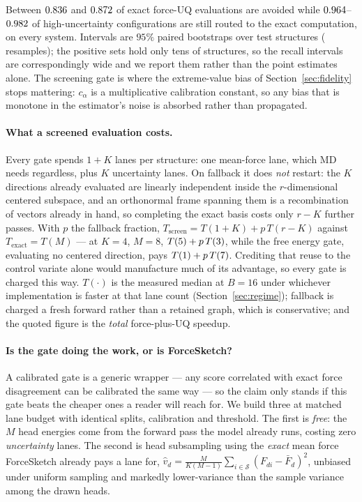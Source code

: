 \documentclass{article}
\begin{document}
Between $0.836$ and $0.872$ of exact force-UQ evaluations are avoided while
$0.964$--$0.982$ of high-uncertainty configurations are still routed to the
exact computation, on every system. Intervals are $95\%$ paired bootstraps over test structures
(\fsNBoot{} resamples); the positive sets hold only tens of structures, so the recall intervals are
correspondingly wide and we report them rather than the point estimates alone.
The screening gate is where the extreme-value bias of Section~\ref{sec:fidelity} stops mattering:
$c_\alpha$ is a multiplicative calibration constant, so any bias that is monotone in the estimator's
noise is absorbed rather than propagated.

\paragraph{What a screened evaluation costs.}
Every gate spends $1{+}K$ lanes per structure: one mean-force lane, which MD needs regardless, plus
$K$ uncertainty lanes. On fallback it does \emph{not} restart: the $K$ directions already evaluated
are linearly independent inside the $r$-dimensional centered subspace, and an orthonormal frame
spanning them is a recombination of vectors already in hand, so completing the exact basis costs
only $r{-}K$ further passes. With $p$ the fallback fraction,
$T_{\mathrm{screen}}=T(1{+}K)+p\,T(r{-}K)$ against $T_{\mathrm{exact}}=T(M)$ --- at $K{=}4$, $M{=}8$,
$T(5)+p\,T(3)$, while the free energy gate, evaluating no centered direction,
pays $T(1)+p\,T(7)$. Crediting that reuse to the control variate alone would
manufacture much of its advantage, so every gate is charged this way. $T(\cdot)$ is the measured
median at $B{=}16$ under whichever implementation is faster at that lane count
(Section~\ref{sec:regime}); fallback is charged a fresh forward rather than a retained graph, which
is conservative; and the quoted figure is the \emph{total} force-plus-UQ speedup.

\paragraph{Is the gate doing the work, or is ForceSketch?}
A calibrated gate is a generic wrapper --- any score correlated with exact force disagreement can be
calibrated the same way --- so the claim only stands if this gate beats the cheaper ones a reader
will reach for. We build three at matched lane budget with identical splits, calibration and
threshold. The first is \emph{free}: the $M$ head energies come from the forward pass the model
already runs, costing zero \emph{uncertainty} lanes. The second is head subsampling using the
\emph{exact} mean force ForceSketch already pays a lane for,
$\hat v_d=\frac{M}{K(M-1)}\sum_{i\in\mathcal S}(F_{di}-\bar F_d)^2$, unbiased under uniform sampling
and markedly lower-variance than the sample variance among the drawn heads.
\end{document}
